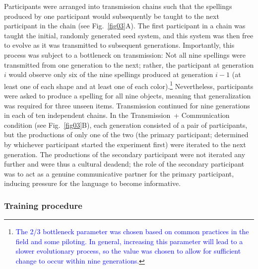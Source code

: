 \documentclass[doc,biblatex]{apa7}
\newcommand\newmaterial[1]{\textcolor{blue}{#1}}
\begin{document}
Participants were arranged into transmission chains such that the spellings produced by one participant would subsequently be taught to the next participant in the chain (see Fig.~\ref{fig03}A). The first participant in a chain was taught the initial, randomly generated seed system, and this system was then free to evolve as it was transmitted to subsequent generations. Importantly, this process was subject to a bottleneck on transmission: Not all nine spellings were transmitted from one generation to the next; rather, the participant at generation $i$ would observe only six of the nine spellings produced at generation $i-1$ (at least one of each shape and at least one of each color).\footnote{\newmaterial{The 2/3 bottleneck parameter was chosen based on common practices in the field and some piloting. In general, increasing this parameter will lead to a slower evolutionary process, so the value was chosen to allow for sufficient change to occur within nine generations.}} Nevertheless, participants were asked to produce a spelling for all nine objects, meaning that generalization was required for three unseen items. Transmission continued for nine generations in each of ten independent chains. In the Transmission~+ Communication condition (see Fig.~\ref{fig03}B), each generation consisted of a pair of participants, but the productions of only one of the two (the primary participant; determined by whichever participant started the experiment first) were iterated to the next generation. The productions of the secondary participant were not iterated any further and were thus a cultural deadend; the role of the secondary participant was to act as a genuine communicative partner for the primary participant, inducing pressure for the language to become informative.

\subsubsection{Training procedure}
\end{document}
